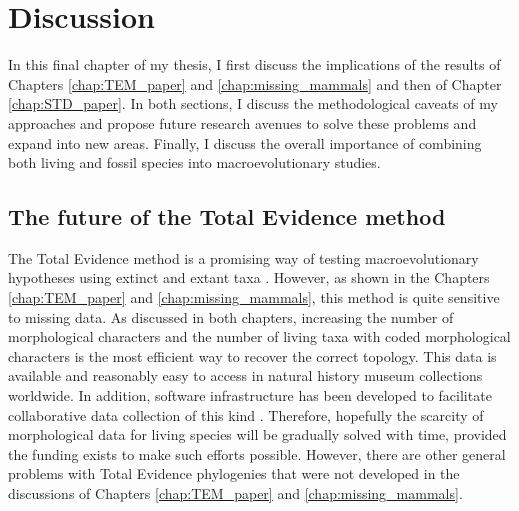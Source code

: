 \chapter{Discussion}
\label{chap:discussion}

%
%

In this final chapter of my thesis, I first discuss the implications of the results of Chapters \ref{chap:TEM_paper} and \ref{chap:missing_mammals} and then of Chapter \ref{chap:STD_paper}.
In both sections, I discuss the methodological caveats of my approaches and propose future research avenues to solve these problems and expand into new areas.
Finally, I discuss the overall importance of combining both living and fossil species into macroevolutionary studies.

\section{The future of the Total Evidence method}
The Total Evidence method is a promising way of testing macroevolutionary hypotheses using extinct and extant taxa \citep[e.g.][]{ronquista2012,slaterphylogenetic2013,Wood01032013,beckancient2014,Dembo2015}.
However, as shown in the Chapters \ref{chap:TEM_paper} and \ref{chap:missing_mammals}, this method is quite sensitive to missing data.
As discussed in both chapters, increasing the number of morphological characters and the number of living taxa with coded morphological characters is the most efficient way to recover the correct topology.
This data is available and reasonably easy to access in natural history museum collections worldwide. 
In addition, software infrastructure has been developed to facilitate collaborative data collection of this kind \citep{morphobank}.
Therefore, hopefully the scarcity of morphological data for living species will be gradually solved with time, provided the funding exists to make such efforts possible.
However, there are other general problems with Total Evidence phylogenies that were not developed in the discussions of Chapters \ref{chap:TEM_paper} and \ref{chap:missing_mammals}. 

